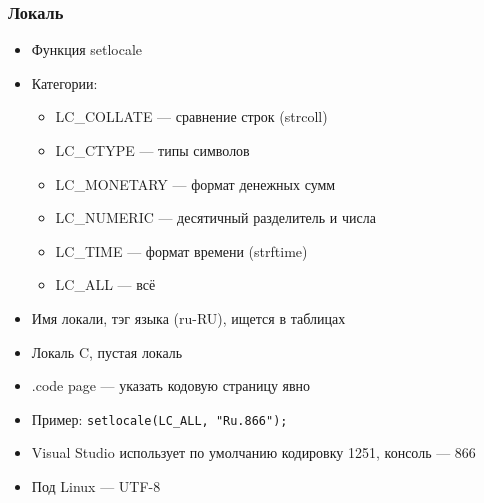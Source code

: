 \documentclass{../../slides-style}
\begin{document}
    \begin{frame}
        \frametitle{Локаль}
        \begin{itemize}
            \item Функция setlocale
            \item Категории: 
            \begin{itemize}
                \item LC\_COLLATE --- сравнение строк (strcoll)
                \item LC\_CTYPE --- типы символов 
                \item LC\_MONETARY --- формат денежных сумм
                \item LC\_NUMERIC --- десятичный разделитель и числа
                \item LC\_TIME --- формат времени (strftime)
                \item LC\_ALL --- всё
            \end{itemize}
            \item Имя локали, тэг языка (ru-RU), ищется в таблицах
            \item Локаль C, пустая локаль
            \item .code page --- указать кодовую страницу явно
            \item Пример: \texttt{setlocale(LC_ALL, "Ru.866");}
            \item Visual Studio использует по умолчанию кодировку 1251, консоль --- 866
            \item Под Linux --- UTF-8
        \end{itemize}
    \end{frame}
\end{document}
